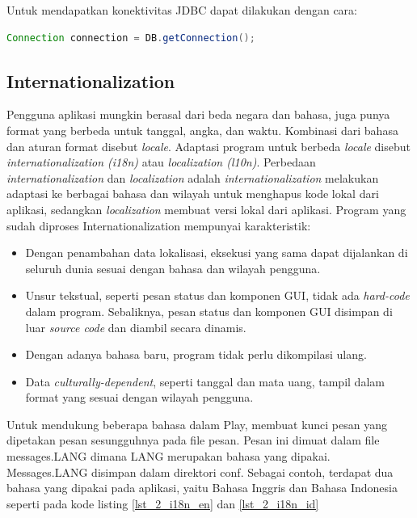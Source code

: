 Untuk mendapatkan konektivitas JDBC dapat dilakukan dengan cara:

\begin{lstlisting}[caption=Contoh mendapatkan konektivitas JDBC,label = {lst_2_konek_jdbc},language=Java]
	Connection connection = DB.getConnection();
\end{lstlisting} 

\subsection{Internationalization}
Pengguna aplikasi mungkin berasal dari beda negara dan bahasa, juga punya format yang berbeda untuk tanggal, angka, dan waktu. Kombinasi dari bahasa dan aturan format disebut \textit{locale}. Adaptasi program untuk berbeda \textit{locale} disebut \textit{internationalization (i18n)} atau \textit{localization (l10n)}. Perbedaan \textit{internationalization} dan \textit{localization} adalah \textit{internationalization} melakukan adaptasi ke berbagai bahasa dan wilayah untuk menghapus kode lokal dari aplikasi, sedangkan \textit{localization} membuat versi lokal dari aplikasi. Program yang sudah diproses Internationalization mempunyai karakteristik:

\begin{itemize}
	\item Dengan penambahan data lokalisasi, eksekusi yang sama dapat dijalankan di seluruh dunia sesuai dengan bahasa dan wilayah pengguna.
	\item Unsur tekstual, seperti pesan status dan komponen GUI, tidak ada \textit{hard-code} dalam program. Sebaliknya, pesan status dan komponen GUI disimpan di luar \textit{source code} dan diambil secara dinamis.
	\item Dengan adanya bahasa baru, program tidak perlu dikompilasi ulang.
	\item Data \textit{culturally-dependent}, seperti tanggal dan mata uang, tampil dalam format yang sesuai dengan wilayah pengguna.
\end{itemize}

Untuk mendukung beberapa bahasa dalam Play, membuat kunci pesan yang dipetakan pesan sesungguhnya pada file pesan. Pesan ini dimuat dalam file messages.LANG dimana LANG merupakan bahasa yang dipakai. Messages.LANG disimpan dalam direktori conf. Sebagai contoh, terdapat dua bahasa yang dipakai pada aplikasi, yaitu Bahasa Inggris dan Bahasa Indonesia seperti pada kode listing \ref{lst_2_i18n_en} dan \ref{lst_2_i18n_id}


